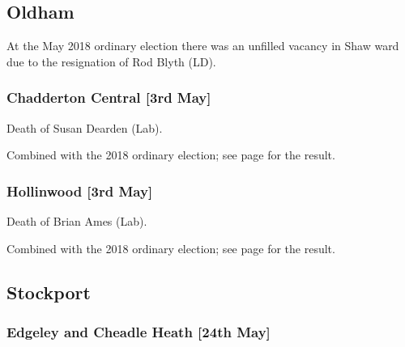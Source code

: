 \documentclass[a4paper,openany]{book}
\begin{document}
\begin{resultsiii}
\subsection*{Oldham}

At the May 2018 ordinary election there was an unfilled vacancy in Shaw ward due to the resignation of Rod Blyth (LD).

\subsubsection*{Chadderton Central \hspace*{\fill}\nolinebreak[1]%
\enspace\hspace*{\fill}
[3rd May]}


Death of Susan Dearden (Lab).

Combined with the 2018 ordinary election; see page \pageref{ChaddertonCentralOldham} for the result.

\subsubsection*{Hollinwood \hspace*{\fill}\nolinebreak[1]%
\enspace\hspace*{\fill}
[3rd May]}


Death of Brian Ames (Lab).

Combined with the 2018 ordinary election; see page \pageref{HollinwoodOldham} for the result.

\subsection*{Stockport}

\subsubsection*{Edgeley and Cheadle Heath \hspace*{\fill}\nolinebreak[1]%
\enspace\hspace*{\fill}
[24th May]}



\end{resultsiii}
\end{document}
